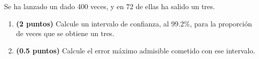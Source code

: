 
Se ha lanzado un dado 400 veces, y en 72 de ellas ha salido un tres.
\begin{enumerate}[label=\alph*)]
\item \textbf{(2 puntos)} Calcule un intervalo de confianza, al 99.2\%, para la proporción de veces que se obtiene un tres.
\item \textbf{(0.5 puntos)} Calcule el error máximo admisible cometido con ese intervalo.
\end{enumerate}
